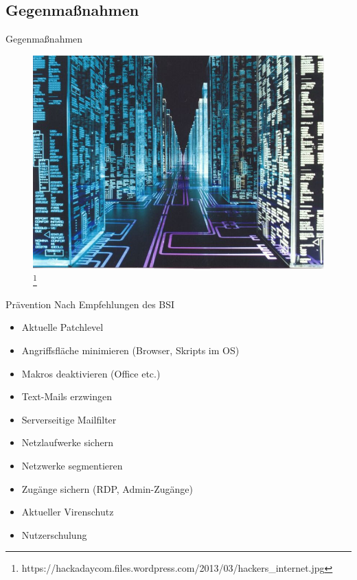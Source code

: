 \documentclass[10pt]{beamer}
\begin{document}
\subsection{Gegenmaßnahmen}
\begin{frame}{Gegenmaßnahmen}
	\begin{figure}[p]
		\centering
		\includegraphics[scale=0.3]{hackers_internet.jpg}
		\let\thefootnote\relax\footnote{https://hackadaycom.files.wordpress.com/2013/03/hackers\_internet.jpg}
	\end{figure}
\end{frame}
\begin{frame}{Prävention}
	Nach Empfehlungen des BSI
	\begin{itemize}
		\item Aktuelle Patchlevel
		\item Angriffsfläche minimieren (Browser, Skripts im OS)
		\item Makros deaktivieren (Office etc.)
		\item Text-Mails erzwingen
		\item Serverseitige Mailfilter
		\item Netzlaufwerke sichern
		\item Netzwerke segmentieren
		\item Zugänge sichern (RDP, Admin-Zugänge)
		\item Aktueller Virenschutz 
		\item Nutzerschulung
	\end{itemize}
\end{frame}
\end{document}
